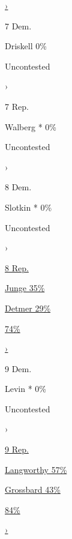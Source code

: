 \href{https://www.nytimes.com/interactive/2020/08/04/us/elections/results-michigan-house-district-6-primary-election.html}{›}

7 Dem.

 Driskell 0\%

Uncontested

›

7 Rep.

 Walberg * 0\%

Uncontested

›

8 Dem.

 Slotkin * 0\%

Uncontested

›

\href{https://www.nytimes.com/interactive/2020/08/04/us/elections/results-michigan-house-district-8-primary-election.html}{8
Rep.}

\href{https://www.nytimes.com/interactive/2020/08/04/us/elections/results-michigan-house-district-8-primary-election.html}{
Junge 35\% }

\href{https://www.nytimes.com/interactive/2020/08/04/us/elections/results-michigan-house-district-8-primary-election.html}{
Detmer 29\% }

\href{https://www.nytimes.com/interactive/2020/08/04/us/elections/results-michigan-house-district-8-primary-election.html}{74\%}

\href{https://www.nytimes.com/interactive/2020/08/04/us/elections/results-michigan-house-district-8-primary-election.html}{›}

9 Dem.

 Levin * 0\%

Uncontested

›

\href{https://www.nytimes.com/interactive/2020/08/04/us/elections/results-michigan-house-district-9-primary-election.html}{9
Rep.}

\href{https://www.nytimes.com/interactive/2020/08/04/us/elections/results-michigan-house-district-9-primary-election.html}{
Langworthy 57\% }

\href{https://www.nytimes.com/interactive/2020/08/04/us/elections/results-michigan-house-district-9-primary-election.html}{
Grossbard 43\% }

\href{https://www.nytimes.com/interactive/2020/08/04/us/elections/results-michigan-house-district-9-primary-election.html}{84\%}

\href{https://www.nytimes.com/interactive/2020/08/04/us/elections/results-michigan-house-district-9-primary-election.html}{›}

